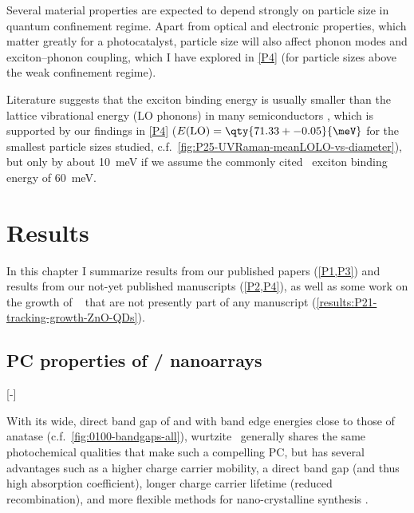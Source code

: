 \documentclass[draft,webedition,openright,titles,swedish,english]{LuaUUThesis}\usepackage[]{graphicx}\usepackage[]{xcolor}
\newcommand{\cf}{c.f.}
\begin{document}
Several material properties are expected to depend strongly on particle size
in quantum confinement regime.
Apart from optical and electronic properties, which matter greatly for a
photocatalyst, particle size will also affect phonon modes and exciton--phonon coupling,
which I have explored in \cref{P4} (for particle sizes above the weak confinement regime).


Literature suggests that the exciton binding energy is usually smaller than the
lattice vibrational energy (LO phonons) in many semiconductors \cite{Adachi1999a},
which is supported by our findings in \cref{P4} ($E(\mathrm{LO})=\qty{71.33+-0.05}{\meV}$
for the smallest particle sizes studied, \cf\ \cref{fig:P25-UVRaman-meanLOLO-vs-diameter}),
but only by about \qty{10}{\meV} if we assume the commonly cited \ZnO\ exciton binding energy
of \qty{60}{\meV}.





\chapter[Results]{Results}
\label{ch:results}

In this chapter I summarize results from our published papers (\cref{P1,P3})
and results from our not-yet published manuscripts (\cref{P2,P4}), as well
as some work on the growth of \ZnO\  that are not presently part
of any manuscript (\cref{results:P21-tracking-growth-ZnO-QDs}).



%

%

%

\section[PC properties of ZnO/CdS nanoarrays]{\texorpdfstring{PC properties of \ZnO/ nanoarrays}{PC properties of ZnO/CdS nanoarrays}}
\label{results:P01-ZnO-CdS-nanoarrays}
[-\baselineskip]

With its wide, direct band gap of  and with band edge energies close to
those of  anatase (\cf\ \cref{fig:0100-bandgaps-all}), wurtzite \ZnO\
generally shares the same photochemical qualities that make  such a compelling \gls{PC},
but has several advantages such as a higher charge carrier mobility, a direct band gap
(and thus high absorption coefficient),
longer charge carrier lifetime (reduced recombination), and more flexible methods
for nano-crystalline synthesis \cite{Quintana2007,Ozgur2005}.
\end{document}
